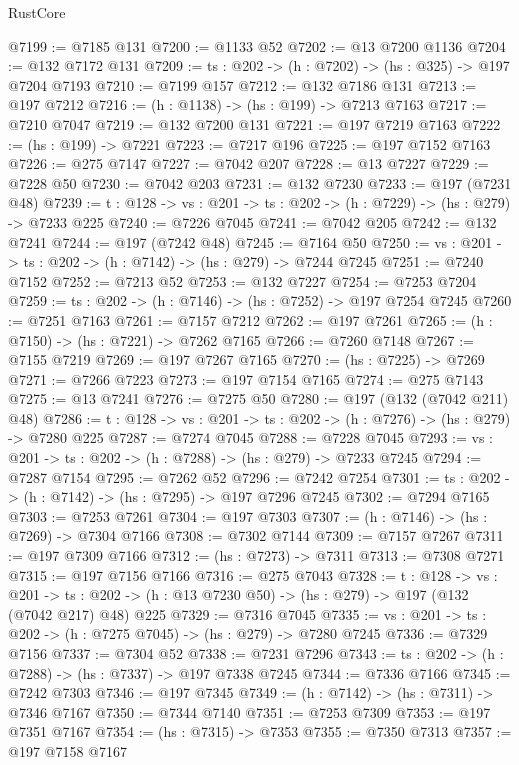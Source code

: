 \begin{lexlean}{RustCore}
\begin{coremodule}
@7199 := @7185 @131
@7200 := @1133 @52
@7202 := @13 @7200 @1136
@7204 := @132 @7172 @131
@7209 := {ts : @202} -> (h : @7202) -> (hs : @325) -> @197 @7204 @7193
@7210 := @7199 @157
@7212 := @132 @7186 @131
@7213 := @197 @7212
@7216 := (h : @1138) -> (hs : @199) -> @7213 @7163
@7217 := @7210 @7047
@7219 := @132 @7200 @131
@7221 := @197 @7219 @7163
@7222 := (hs : @199) -> @7221
@7223 := @7217 @196
@7225 := @197 @7152 @7163
@7226 := @275 @7147
@7227 := @7042 @207
@7228 := @13 @7227
@7229 := @7228 @50
@7230 := @7042 @203
@7231 := @132 @7230
@7233 := @197 (@7231 @48)
@7239 := {t : @128} -> {vs : @201} -> {ts : @202} -> (h : @7229) -> (hs : @279) -> @7233 @225
@7240 := @7226 @7045
@7241 := @7042 @205
@7242 := @132 @7241
@7244 := @197 (@7242 @48)
@7245 := @7164 @50
@7250 := {vs : @201} -> {ts : @202} -> (h : @7142) -> (hs : @279) -> @7244 @7245
@7251 := @7240 @7152
@7252 := @7213 @52
@7253 := @132 @7227
@7254 := @7253 @7204
@7259 := {ts : @202} -> (h : @7146) -> (hs : @7252) -> @197 @7254 @7245
@7260 := @7251 @7163
@7261 := @7157 @7212
@7262 := @197 @7261
@7265 := (h : @7150) -> (hs : @7221) -> @7262 @7165
@7266 := @7260 @7148
@7267 := @7155 @7219
@7269 := @197 @7267 @7165
@7270 := (hs : @7225) -> @7269
@7271 := @7266 @7223
@7273 := @197 @7154 @7165
@7274 := @275 @7143
@7275 := @13 @7241
@7276 := @7275 @50
@7280 := @197 (@132 (@7042 @211) @48)
@7286 := {t : @128} -> {vs : @201} -> {ts : @202} -> (h : @7276) -> (hs : @279) -> @7280 @225
@7287 := @7274 @7045
@7288 := @7228 @7045
@7293 := {vs : @201} -> {ts : @202} -> (h : @7288) -> (hs : @279) -> @7233 @7245
@7294 := @7287 @7154
@7295 := @7262 @52
@7296 := @7242 @7254
@7301 := {ts : @202} -> (h : @7142) -> (hs : @7295) -> @197 @7296 @7245
@7302 := @7294 @7165
@7303 := @7253 @7261
@7304 := @197 @7303
@7307 := (h : @7146) -> (hs : @7269) -> @7304 @7166
@7308 := @7302 @7144
@7309 := @7157 @7267
@7311 := @197 @7309 @7166
@7312 := (hs : @7273) -> @7311
@7313 := @7308 @7271
@7315 := @197 @7156 @7166
@7316 := @275 @7043
@7328 := {t : @128} ->
  {vs : @201} ->
  {ts : @202} -> (h : @13 @7230 @50) -> (hs : @279) -> @197 (@132 (@7042 @217) @48) @225
@7329 := @7316 @7045
@7335 := {vs : @201} -> {ts : @202} -> (h : @7275 @7045) -> (hs : @279) -> @7280 @7245
@7336 := @7329 @7156
@7337 := @7304 @52
@7338 := @7231 @7296
@7343 := {ts : @202} -> (h : @7288) -> (hs : @7337) -> @197 @7338 @7245
@7344 := @7336 @7166
@7345 := @7242 @7303
@7346 := @197 @7345
@7349 := (h : @7142) -> (hs : @7311) -> @7346 @7167
@7350 := @7344 @7140
@7351 := @7253 @7309
@7353 := @197 @7351 @7167
@7354 := (hs : @7315) -> @7353
@7355 := @7350 @7313
@7357 := @197 @7158 @7167

\end{coremodule}
\end{lexlean}
